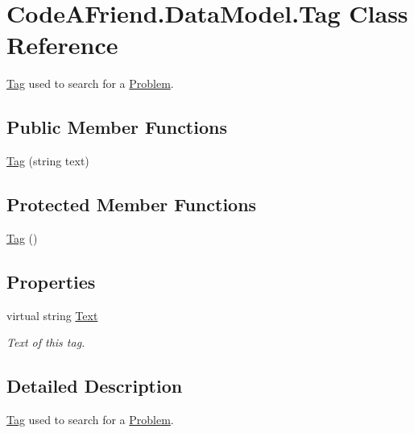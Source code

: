 \hypertarget{class_code_a_friend_1_1_data_model_1_1_tag}{}\section{Code\+A\+Friend.\+Data\+Model.\+Tag Class Reference}
\label{class_code_a_friend_1_1_data_model_1_1_tag}


\mbox{\hyperlink{class_code_a_friend_1_1_data_model_1_1_tag}{Tag}} used to search for a \mbox{\hyperlink{class_code_a_friend_1_1_data_model_1_1_problem}{Problem}}.  


\subsection*{Public Member Functions}
\begin{DoxyCompactItemize}
\item 
\mbox{\hyperlink{class_code_a_friend_1_1_data_model_1_1_tag_a7087855594c48bc2a52a563aabd2baef}{Tag}} (string text)
\end{DoxyCompactItemize}
\subsection*{Protected Member Functions}
\begin{DoxyCompactItemize}
\item 
\mbox{\hyperlink{class_code_a_friend_1_1_data_model_1_1_tag_a7bfc274d466275cd16448ac98a12153b}{Tag}} ()
\end{DoxyCompactItemize}
\subsection*{Properties}
\begin{DoxyCompactItemize}
\item 
virtual string \mbox{\hyperlink{class_code_a_friend_1_1_data_model_1_1_tag_a72f0cb31f1ceb9d29b116eb7340fe618}{Text}}
\begin{DoxyCompactList}\small\item\em Text of this tag. \end{DoxyCompactList}\end{DoxyCompactItemize}


\subsection{Detailed Description}
\mbox{\hyperlink{class_code_a_friend_1_1_data_model_1_1_tag}{Tag}} used to search for a \mbox{\hyperlink{class_code_a_friend_1_1_data_model_1_1_problem}{Problem}}. 




